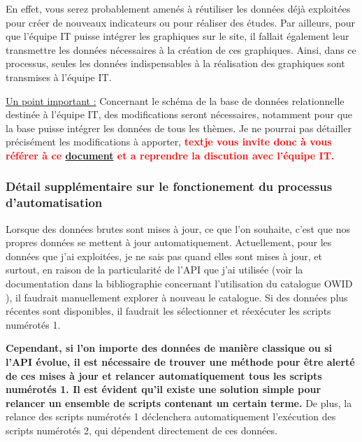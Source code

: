 \documentclass[12pt]{article}
\begin{document}
En effet, vous serez probablement amenés à réutiliser les données déjà exploitées 
pour créer de nouveaux indicateurs ou pour réaliser des études. Par ailleurs, 
pour que l'équipe IT puisse intégrer les graphiques sur le site, il fallait également 
leur transmettre les données nécessaires à la création de ces graphiques. Ainsi, 
dans ce processus, seules les données indispensables à la réalisation des graphiques 
sont transmises à l'équipe IT.\newline

\underline{Un point important :} \newline
Concernant le schéma de la base de données relationnelle destinée à l'équipe IT, 
des modifications seront nécessaires, notamment pour que la base puisse intégrer 
les données de tous les thèmes. Je ne pourrai pas détailler précisément les 
modifications à apporter, \textbf{\textcolor{red}{textje vous invite donc à vous référer 
à ce \href{https://drive.google.com/file/d/11nOikPpWf0RxfUbokaihUFs0ikDgmV8A/view?usp=sharing}{document} 
et a reprendre la discution avec l'équipe IT.}}


\subsubsection{Détail supplémentaire sur le fonctionement du processus d'automatisation}

Lorsque des données brutes sont mises à jour, ce que l'on souhaite, 
c'est que nos propres données se mettent à jour automatiquement. 
Actuellement, pour les données que j'ai exploitées, je ne sais pas 
quand elles sont mises à jour, et surtout, en raison de la particularité 
de l'API que j'ai utilisée (voir la documentation dans la bibliographie 
concernant l'utilisation du catalogue OWID \cite{API_OWID}), il faudrait manuellement 
explorer à nouveau le catalogue. Si des données plus récentes sont disponibles, 
il faudrait les sélectionner et réexécuter les scripts numérotés 1.\newline

\textbf{Cependant, si l'on importe des données de manière classique ou si l'API évolue, 
il est nécessaire de trouver une méthode pour être alerté de ces mises à jour 
et relancer automatiquement tous les scripts numérotés 1. Il est évident qu'il 
existe une solution simple pour relancer un ensemble de scripts contenant un certain 
terme.} De plus, la relance des scripts numérotés 1 déclenchera automatiquement 
l'exécution des scripts numérotés 2, qui dépendent directement de ces données.\newline
\end{document}
